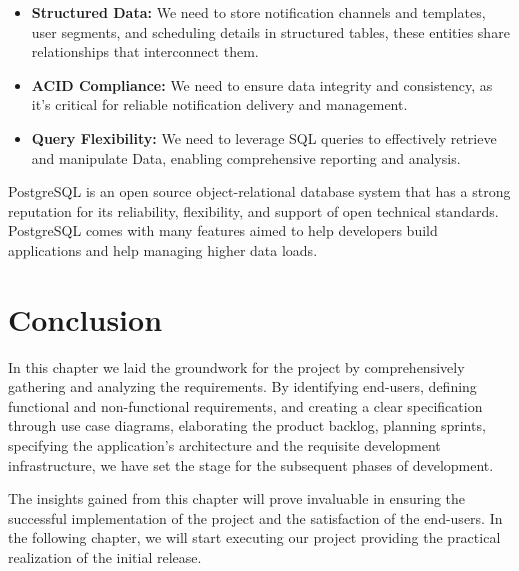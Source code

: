 \begin{itemize}
      \item \textbf{Structured Data:} We need to store notification channels and templates, user segments,
            and scheduling details in structured tables, these entities share relationships that
            interconnect them.
      \item \textbf{ACID Compliance:} We need to ensure data integrity and consistency, as it's critical
            for reliable notification delivery and management.
      \item \textbf{Query Flexibility:} We need to leverage SQL queries to effectively retrieve and manipulate
            Data, enabling comprehensive reporting and analysis.
\end{itemize}

\noindent PostgreSQL is an open source object-relational database system that has a strong reputation for its
reliability, flexibility, and support of open technical standards. PostgreSQL comes with many features
aimed to help developers build applications and help managing higher data loads.

\section*{Conclusion}
In this chapter we laid the groundwork for the project by comprehensively gathering and analyzing
the requirements. By identifying end-users, defining functional and non-functional requirements,
and creating a clear specification through use case diagrams, elaborating the product backlog, planning
sprints, specifying the application's architecture and the requisite development infrastructure, we have
set the stage for the subsequent phases of development.

The insights gained from this chapter will prove invaluable in ensuring the successful implementation
of the project and the satisfaction of the end-users. In the following chapter, we will start executing
our project providing the practical realization of the initial release.
